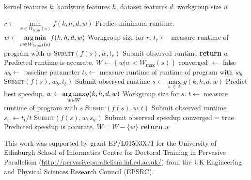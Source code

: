 \documentclass[nonatbib,preprint,9pt]{sigplanconf}
\begin{document}
\begin{algorithm}
\begin{algorithmic}[1]
\Require kernel features $k$, hardware features $h$, dataset features $d$.
\Ensure workgroup size $w$

\State $r \leftarrow \underset{w \in W_{legal}(s)}{\min} f(k,h,d,w)$
\Comment Predict minimum runtime.
\State $w \leftarrow \underset{w \in W_{legal}(s)}{\operatorname*{arg\,min}} f(k,h,d,w)$
\Comment Workgroup size for $r$.
\State $t_r \leftarrow$ measure runtime of program with $w$
\State \textsc{Submit}$\left( f(s), w, t_r \right)$
\Comment Submit observed runtime
  \State \textbf{return} $w$
\Comment Predicted runtime is accurate.
\Else
   \State $W \leftarrow \left\{ w | w < W_{\max}(s) \right\}$
   \State converged $\leftarrow$ false
   \State $w_b \leftarrow$ baseline parameter
   \State $t_b \leftarrow$ measure runtime of runtime of program with
   $w_b$
   \State \textsc{Submit}$\left( f(s), w_b, t_b \right)$
   \Comment Submit observed runtime
     \State $s \leftarrow \underset{w \in W}{\max} g(k,h,d,w)$
     \Comment Predict best speedup.
     \State $w \leftarrow \underset{w \in W}{\operatorname*{arg\,max}} g(k,h,d,w)$
     \Comment Workgroup size for $s$.
     \State $t \leftarrow$ measure runtime of program with $s$
     \State \textsc{Submit}$\left( f(s), w, t \right)$
     \Comment Submit observed runtime
     \State $s_w \leftarrow t_t / t$
     \State \textsc{Submit}$\left( f(s), w, s_w \right)$
     \Comment Submit observed speedup
       \State converged = true
       \Comment Predicted speedup is accurate.
     \Else
       \State $W = W - \{ w \}$
     \EndIf
   \EndWhile
   \State \textbf{return} $w$
\EndIf
\end{algorithmic}
\caption{%
  Selecting workgroup size using a combination of classifiers and
  regressors.%
}
\label{alg:autotune-hybrid}
\end{algorithm}



%
%
%

\acks

This work was supported by grant EP/L01503X/1 for the University of
Edinburgh School of Informatics Centre for Doctoral Training in
Pervasive Parallelism (\url{http://pervasiveparallelism.inf.ed.ac.uk/}) from
the UK Engineering and Physical Sciences Research Council (EPSRC).


\label{bibliography}
\printbibliography
\end{document}
